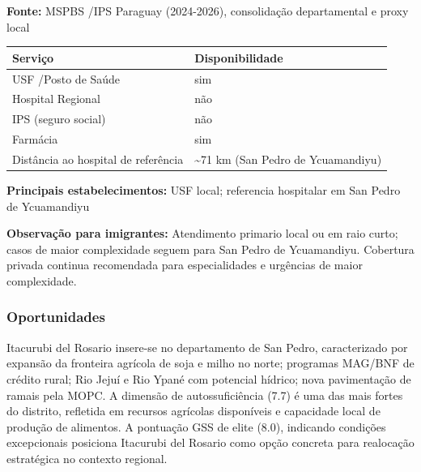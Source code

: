 \textbf{Fonte:} MSPBS /\allowbreak  IPS Paraguay (2024-2026), consolidação
departamental e proxy local

{\def\LTcaptype{none} %
\begin{longtable}[]{@{}
  >{\raggedright\arraybackslash}p{}
  >{\raggedright\arraybackslash}p{}@{}}
\toprule\noalign{}
\begin{minipage}[b]{\linewidth}\raggedright
Serviço
\end{minipage} & \begin{minipage}[b]{\linewidth}\raggedright
Disponibilidade
\end{minipage} \\
\midrule\noalign{}
\endhead
\bottomrule\noalign{}
\endlastfoot
USF /\allowbreak  Posto de Saúde & sim \\
Hospital Regional & não \\
IPS (seguro social) & não \\
Farmácia & sim \\
Distância ao hospital de referência & \textasciitilde71 km (San Pedro de
Ycuamandiyu) \\
\end{longtable}
}

\textbf{Principais estabelecimentos:} USF local; referencia hospitalar
em San Pedro de Ycuamandiyu

\textbf{Observação para imigrantes:} Atendimento primario local ou em
raio curto; casos de maior complexidade seguem para San Pedro de
Ycuamandiyu. Cobertura privada continua recomendada para especialidades
e urgências de maior complexidade.
\newpage

\subsubsection*{Oportunidades}\label{oport-itacurubi-del-rosario-0205}
Itacurubi del Rosario insere-se no departamento de San Pedro, caracterizado por expansão da fronteira agrícola de soja e milho no norte; programas MAG/BNF de crédito rural; Rio Jejuí e Rio Ypané com potencial hídrico; nova pavimentação de ramais pela MOPC. A dimensão de autossuficiência (7.7) é uma das mais fortes do distrito, refletida em recursos agrícolas disponíveis e capacidade local de produção de alimentos. A pontuação GSS de elite (8.0), indicando condições excepcionais posiciona Itacurubi del Rosario como opção concreta para realocação estratégica no contexto regional.

